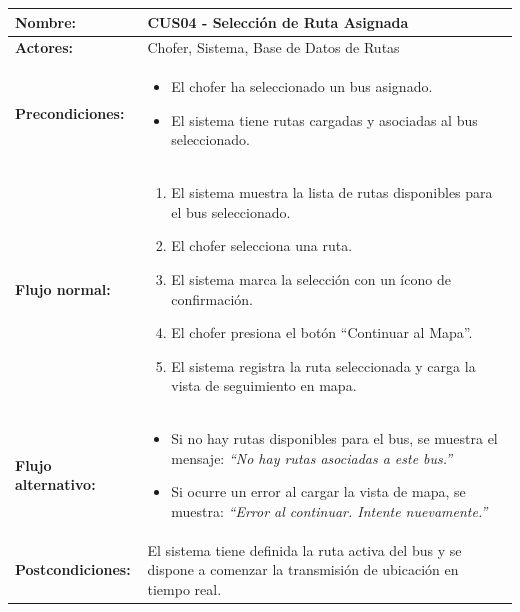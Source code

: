 \documentclass[12pt]{article}
\begin{document}
    \clearpage
    \begin{table}[!h]
    \centering
    \begin{tabular}{|p{3.5cm}|p{11cm}|}
    \hline
    \textbf{Nombre:} & CUS04 - Selección de Ruta Asignada \\
    \hline
    \textbf{Actores:} & Chofer, Sistema, Base de Datos de Rutas \\
    \hline
    \textbf{Precondiciones:} &
    \begin{itemize}
        \item El chofer ha seleccionado un bus asignado.
        \item El sistema tiene rutas cargadas y asociadas al bus seleccionado.
    \end{itemize}
    \\
    \hline
    \textbf{Flujo normal:} &
    \begin{enumerate}
        \item El sistema muestra la lista de rutas disponibles para el bus seleccionado.
        \item El chofer selecciona una ruta.
        \item El sistema marca la selección con un ícono de confirmación.
        \item El chofer presiona el botón “Continuar al Mapa”.
        \item El sistema registra la ruta seleccionada y carga la vista de seguimiento en mapa.
    \end{enumerate}
    \\
    \hline
    \textbf{Flujo alternativo:} &
    \begin{itemize}
        \item[1a.] Si no hay rutas disponibles para el bus, se muestra el mensaje: \textit{“No hay rutas asociadas a este bus.”}
        \item[4a.] Si ocurre un error al cargar la vista de mapa, se muestra: \textit{“Error al continuar. Intente nuevamente.”}
    \end{itemize}
    \\
    \hline
    \textbf{Postcondiciones:} &
    El sistema tiene definida la ruta activa del bus y se dispone a comenzar la transmisión de ubicación en tiempo real.
    \\
    \hline
    \end{tabular}
    \end{table}
\end{document}
